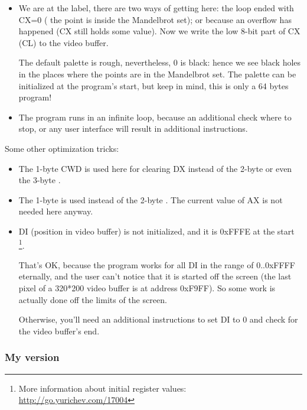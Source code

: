 \begin{itemize}
\item We are at the  label, there are two ways of getting here: 
the loop ended with CX=0 (
the point is inside the Mandelbrot set); or because an overflow has happened (CX still holds some value).
Now we write the low 8-bit part of CX (CL) to the 
video buffer.

The default palette is rough, nevertheless, 0 is black: hence we see black holes in the places where the points are
in the Mandelbrot set.
The palette can be initialized at the program's start, but keep in mind, this is only a 64 bytes program!

\item The program runs in an infinite loop, 
because an additional check where to stop, or any user interface will result in additional instructions.

\end{itemize}

Some other optimization tricks:

\begin{itemize}
\item The 1-byte CWD is used here 
for clearing DX instead of the 2-byte  or even the 3-byte .

\item The 1-byte  is used instead of the 2-byte 
. 
The current value of AX is not needed here anyway.

\item DI (position in video buffer) is not initialized, and it is 0xFFFE at the start
\footnote{More information about initial register values: 
\url{http://go.yurichev.com/17004}}.

That's OK, because the program works for all DI in the range of 0..0xFFFF eternally, 
and the user can't notice
that it is started off the screen (the last pixel of a 320*200 video buffer is at address 0xF9FF).
So some work is actually done 
off the limits of the screen.

Otherwise, you'll need an additional instructions to set DI to 0 and check for the video buffer's end.

\end{itemize}

\newcommand{\MyFixedVersion}{My  version}
\subsubsection{\MyFixedVersion}


